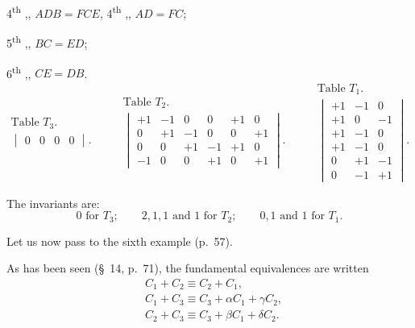 \documentclass{article}
\begin{document}
4\textsuperscript{th} ,, $ADB = FCE$, 4\textsuperscript{th} ,, $AD = FC$;

5\textsuperscript{th} ,, $BC = ED$;

6\textsuperscript{th} ,, $CE = DB$.
\[ \begin{gathered} \text{Table } T_{3}. \\ \begin{vmatrix} 0 & 0 & 0 & 0 \end{vmatrix}. \end{gathered} \qquad \begin{gathered} \text{Table } T_{2}. \\ \begin{vmatrix} +1 & -1 & 0 & 0 & +1 & 0 \\[1ex] 0 & +1 & -1 & 0 & 0 & +1 \\[1ex] 0 & 0 & +1 & -1 & +1 & 0 \\[1ex] -1 & 0 & 0 & +1 & 0 & +1 \end{vmatrix}. \end{gathered} \qquad \begin{gathered} \text{Table } T_{1}. \\ \begin{vmatrix} +1 & -1 & 0 \\[1ex] +1 & 0 & -1 \\[1ex] +1 & -1 & 0 \\[1ex] +1 & -1 & 0 \\[1ex] 0 & +1 & -1 \\[1ex] 0 & -1 & +1 \end{vmatrix}. \end{gathered} \]

The invariants are:
\[ 0 \text{ for } T_{3}; \qquad 2, 1, 1 \text{ and } 1 \text{ for } T_{2}; \qquad 0, 1 \text{ and } 1 \text{ for } T_{1}. \]

Let us now pass to the sixth example (p.\ 57).

As has been seen (\S~14, p.\ 71), the fundamental equivalences are written
\[ \begin{aligned} &C_{1} + C_{2} \equiv C_{2} + C_{1},\\ &C_{1} + C_{3} \equiv C_{3} + \alpha C_{1} + \gamma C_{2},\\ &C_{2} + C_{3} \equiv C_{3} + \beta C_{1} + \delta C_{2}. \end{aligned} \]
\end{document}
